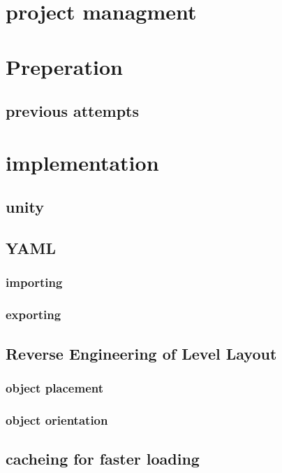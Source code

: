 \section{project managment}

\section{Preperation}
\subsection{previous attempts}


\section{implementation}
\subsection{unity}

\subsection{YAML}
\subsubsection{importing}
\subsubsection{exporting}

\subsection{Reverse Engineering of Level Layout}
\subsubsection{object placement}
\subsubsection{object orientation}

\subsection{cacheing for faster loading}

